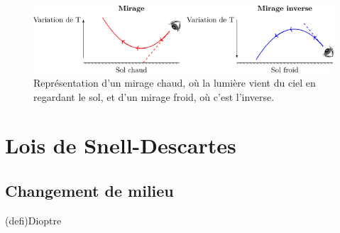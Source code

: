 \documentclass[../../main/main.tex]{subfiles}
\begin{document}
\begin{figure}[htbp]
	\centering
	\includegraphics[width=\linewidth]{mirages}
	\caption{Représentation d'un mirage chaud, où la lumière vient du ciel en
		regardant le sol, et d'un mirage froid, où c'est l'inverse.}
	\label{fig:mirages}
\end{figure}

\section{Lois de Snell-Descartes}
\subsection{Changement de milieu}

\begin{tcb*}[label=def:dioptre, sidebyside, righthand ratio=.4](defi){Dioptre}
	\tcblower
	\begin{center}
	\end{center}
\end{tcb*}
\end{document}
